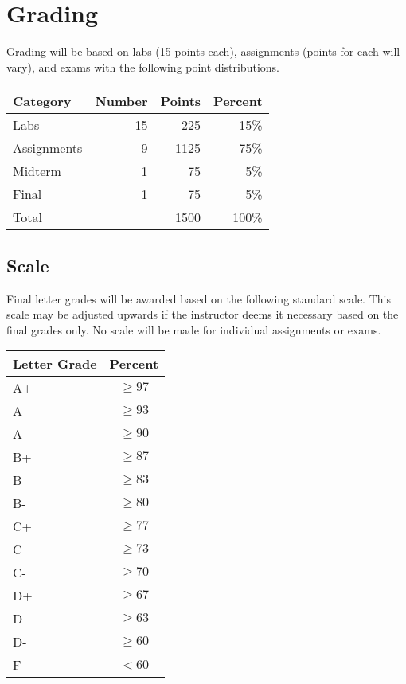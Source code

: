 \documentclass[12pt]{scrartcl}
\begin{document}
\section{Grading}

Grading will be based on labs (15 points each), assignments (points
for each will vary), and exams with the following point distributions.

\begin{table}[h]
\centering
\begin{tabular}{lrrr}
Category & Number & Points & Percent \\
\hline\hline
Labs        & 15 & 225 & 15\% \\
Assignments & 9  & 1125 & 75\% \\
Midterm     & 1  & 75 & 5\% \\
Final       & 1  & 75 & 5\% \\
\hline
Total & ~ & 1500 & 100\% 
\end{tabular}
\end{table}

\subsection{Scale}

Final letter grades will be awarded based on the following 
standard scale. This scale may be adjusted upwards if the 
instructor deems it necessary based on the final grades only.  
No scale will be made for individual assignments or exams.

\begin{table}[h]
\centering
\begin{tabular}{p{1cm}c}
Letter Grade & Percent \\
\hline\hline
A+ & $\geq 97$ \\
A  & $\geq 93$ \\
A- & $\geq 90$ \\
B+ & $\geq 87$ \\
B  & $\geq 83$ \\
B- & $\geq 80$ \\
C+ & $\geq 77$ \\
C  & $\geq 73$ \\
C- & $\geq 70$ \\
D+ & $\geq 67$ \\
D  & $\geq 63$ \\
D- & $\geq 60$ \\
F  & $<60$ \\
\end{tabular}
\end{table}
\end{document}
